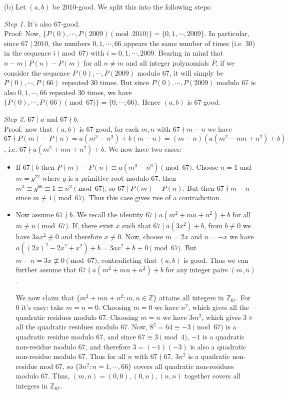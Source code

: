 \documentclass[11pt]{article}
\newcommand{\bbZ}{\mathbb Z}
\newcommand{\<}{\langle}
\renewcommand{\>}{\rangle}
\begin{document}
\begin{enumerate}
	(b) Let $(a, b)$ be 2010-good. We split this into the following steps: 
	
	\emph{Step 1.} It's also 67-good. \\
	Proof: Now, $\{P(0), \cdots , P(2009) \pmod{2010}\}=\{0, 1, \cdots , 2009\}$. In particular, since $67\mid 2010$, the numbers $0, 1, \cdots , 66$ appears the same number of times (i.e. 30) in the sequence $i\pmod{67}$ with $i=0, 1, \cdots , 2009$. 
	Bearing in mind that $n-m\mid P(n)-P(m)$ for all $n\neq m$ and all integer polynomials $P$, if we consider the sequence $P(0), \cdots , P(2009)$ modulo 67, it will simply be $P(0), \cdots , P(66)$ repeated 30 times. But since $P(0), \cdots , P(2009)$ modulo 67 is also $0, 1, \cdots , 66$ repeated 30 times, we have $\{P(0), \cdots , P(66)\pmod{67}\}=\{0, \cdots, 66\}$. Hence $(a, b)$ is 67-good. 
	
	\emph{Step 2.} $67\mid a$ and $67\nmid b$. \\
	Proof: now that $(a, b)$ is 67-good, for each $m, n$ with $67\nmid m-n$ we have $67\nmid P(m)-P(n)=a(m^3-n^3)+b(m-n)=(m-n)(a(m^2-mn+n^2)+b)$, i.e. $67\nmid a(m^2+mn+n^2)+b$. We now have two cases: 
	\begin{itemize}
		\item If $67\mid b$ then $P(m)-P(n)\equiv a(m^3-n^3)\pmod{67}$. Choose $n=1$ and $m=g^{22}$ where $g$ is a primitive root modulo 67, then $m^3\equiv g^{66}\equiv 1\equiv n^3\pmod{67}$, so $67\mid P(m)-P(n)$. But then $67\nmid m-n$ since $m\not\equiv 1\pmod{67}$. Thus this case gives rise of a contradiction. 
		
		\item Now assume $67\nmid b$. We recall the identity $67\nmid a(m^2+mn+n^2)+b$ for all $m\not\equiv n\pmod{67}$. 
		If, there exist $x$ such that $67\mid a(3x^2)+b$, from $b\not\equiv 0$ we have $3ax^2\not\equiv 0$ and therefore $x\not\equiv 0$. 
		Now, choose $m=2x$ and $n=-x$ we have $a((2x)^2-2x^2+x^2)+b=3ax^2+b\equiv 0\pmod{67}$. 
		But $m-n=3x\not\equiv 0\pmod{67}$, contradicting that $(a, b)$ is good. 
		Thus we can further assume that $67\nmid a(m^2+mn+n^2)+b$ for any integer pairs $(m, n)$. 
		
		We now claim that $\{m^2+mn+n^2:m, n\in\bbZ\}$ attains all integers in $\bbZ_{67}$. For $0$ it's easy: take $m=n=0$. Choosing $m=0$ we have $n^2$, which gives all the quadratic residues modulo 67. Choosing $m=n$ we have $3m^2$, which gives $3\times$ all the quadratic residues modulo 67. 
		Now, $8^2=64\equiv-3\pmod{67}$ is a quadratic residue modulo 67, and since $67\equiv 3\pmod{4}$, $-1$ is a quadratic non-residue modulo 67, and therefore $3=(-1)(-3)$ is also a quadratic non-residue modulo 67. 
		Thus for all $n$ with $67\nmid 67$, $3n^2$ is a quadratic non-residue mod 67, so $\{3n^2: n=1, \cdots , 66\}$ covers all quadratic non-residues modulo 67. Thus, 
		$(m, n)=(0, 0), (0, n), (n, n)$ together covers all integers in $\bbZ_{67}$. 
		

\end{itemize}
\end{enumerate}
\end{document}
